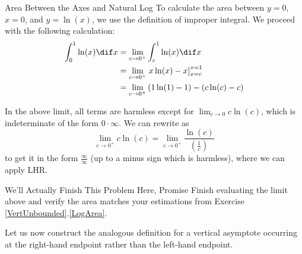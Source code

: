 \begin{example}{Area Between the Axes and Natural Log}
To calculate the area between $y=0$, $x=0$, and $y=\ln(x)$, we use the definition of improper integral.  We proceed with the following calculation: 
\begin{align*}
\int_0^1 \ln(x) \dif x &= \lim_{c\rightarrow 0^+} \int_c^1 \ln(x) \dif x \\
&=\lim_{c\rightarrow 0^+}  \left. x\ln(x)-x \right]_{x=c}^{x=1} \\
&=\lim_{c\rightarrow 0^+}  \left(1\ln(1)-1\right) -\left(c\ln(c)-c\right)
\end{align*}

In the above limit, all terms are harmless except for $\lim_{c\rightarrow 0}c\ln(c)$, which is indeterminate of the form $0\cdot \infty$.  We can rewrite as $$\lim_{c\rightarrow 0^+}c\ln(c)=\lim_{c\rightarrow 0^+}\frac{\ln(c)}{\left(\frac{1}{c}\right)}$$ to get it in the form $\frac{\infty}{\infty}$ (up to a minus sign which is harmless), where we can apply LHR.
\end{example}

\begin{exercise}{We'll Actually Finish This Problem Here, Promise \Coffeecup \Coffeecup}
Finish evaluating the limit above and verify the area matches your estimations from Exercise \ref{VertUnbounded}.\ref{LogArea}.
\end{exercise}

Let us now construct the analogous definition for a vertical asymptote occurring at the right-hand endpoint rather than the left-hand endpoint.

